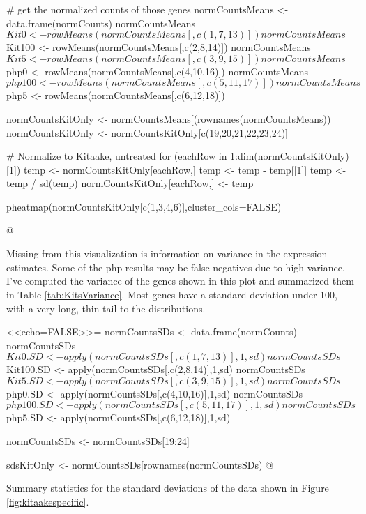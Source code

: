 \documentclass{article}
\begin{document}
{{{{# get the normalized counts of those genes
normCountsMeans <- data.frame(normCounts)
normCountsMeans$Kit0 <-   rowMeans(normCountsMeans[,c(1,7,13)])
normCountsMeans$Kit100 <- rowMeans(normCountsMeans[,c(2,8,14)])
normCountsMeans$Kit5 <-   rowMeans(normCountsMeans[,c(3,9,15)])
normCountsMeans$php0 <-   rowMeans(normCountsMeans[,c(4,10,16)])
normCountsMeans$php100 <- rowMeans(normCountsMeans[,c(5,11,17)])
normCountsMeans$php5 <-   rowMeans(normCountsMeans[,c(6,12,18)])


normCountsKitOnly <- normCountsMeans[(rownames(normCountsMeans)) %
normCountsKitOnly <- normCountsKitOnly[c(19,20,21,22,23,24)]

# Normalize to Kitaake, untreated
for (eachRow in 1:dim(normCountsKitOnly)[1]) {
	temp <- normCountsKitOnly[eachRow,]
	temp <- temp - temp[[1]]
	temp <- temp / sd(temp)
	normCountsKitOnly[eachRow,] <- temp
}

pheatmap(normCountsKitOnly[c(1,3,4,6)],cluster_cols=FALSE)

@


Missing from this visualization is information on variance in the expression estimates. Some of the php results may be false negatives due to high variance. I've computed the variance of the genes shown in this plot and summarized them in Table \ref{tab:KitsVariance}. Most genes have a standard deviation under 100, with a very long, thin tail to the distributions.



<<echo=FALSE>>=
normCountsSDs <- data.frame(normCounts)
normCountsSDs$Kit0.SD <-   apply(normCountsSDs[,c(1,7,13)],1,sd)
normCountsSDs$Kit100.SD <- apply(normCountsSDs[,c(2,8,14)],1,sd)
normCountsSDs$Kit5.SD <-   apply(normCountsSDs[,c(3,9,15)],1,sd)
normCountsSDs$php0.SD <-   apply(normCountsSDs[,c(4,10,16)],1,sd)
normCountsSDs$php100.SD <- apply(normCountsSDs[,c(5,11,17)],1,sd)
normCountsSDs$php5.SD <-   apply(normCountsSDs[,c(6,12,18)],1,sd)

normCountsSDs <- normCountsSDs[19:24]

sdsKitOnly <- normCountsSDs[rownames(normCountsSDs) %
@

\begin{table}
	\caption{Summary statistics for the standard deviations of the data shown in Figure \ref{fig:kitaakespecific}.}
	\label{tab:KitsVariance}
\end{table}

}}}}
\end{document}
